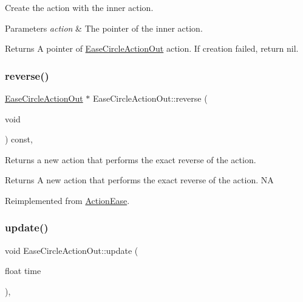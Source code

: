 Create the action with the inner action. 


\begin{DoxyParams}{Parameters}
{\em action} & The pointer of the inner action. \\
\hline
\end{DoxyParams}
\begin{DoxyReturn}{Returns}
A pointer of \hyperlink{classEaseCircleActionOut}{Ease\+Circle\+Action\+Out} action. If creation failed, return nil. 
\end{DoxyReturn}
\mbox{\label{classEaseCircleActionOut_aa42aec9f04ec15a24fd9deed855f9529}} 
\subsubsection{\texorpdfstring{reverse()}{reverse()}}
{\footnotesize\ttfamily \hyperlink{classEaseCircleActionOut}{Ease\+Circle\+Action\+Out} $\ast$ Ease\+Circle\+Action\+Out\+::reverse (\begin{DoxyParamCaption}\item[{void}]{ }\end{DoxyParamCaption}) const\hspace{0.3cm}{\ttfamily [override]}, {\ttfamily [virtual]}}

Returns a new action that performs the exact reverse of the action.

\begin{DoxyReturn}{Returns}
A new action that performs the exact reverse of the action.  NA 
\end{DoxyReturn}


Reimplemented from \hyperlink{classActionEase_ab99eb083fa033fae1d6c948fdc730782}{Action\+Ease}.

\mbox{\label{classEaseCircleActionOut_a48e4c603a5dd0eb56f289dd2ffd8d26b}} 
\subsubsection{\texorpdfstring{update()}{update()}}
{\footnotesize\ttfamily void Ease\+Circle\+Action\+Out\+::update (\begin{DoxyParamCaption}\item[{float}]{time }\end{DoxyParamCaption})\hspace{0.3cm}{\ttfamily [override]}, {\ttfamily [virtual]}}


